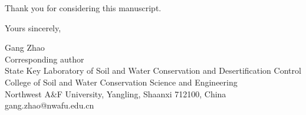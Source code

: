\documentclass[a4paper,11pt]{article}
\begin{document}
Thank you for considering this manuscript.

Yours sincerely,

Gang Zhao\\
Corresponding author\\
State Key Laboratory of Soil and Water Conservation and Desertification Control\\
College of Soil and Water Conservation Science and Engineering\\
Northwest A\&F University, Yangling, Shaanxi 712100, China\\
gang.zhao@nwafu.edu.cn
\end{document}
